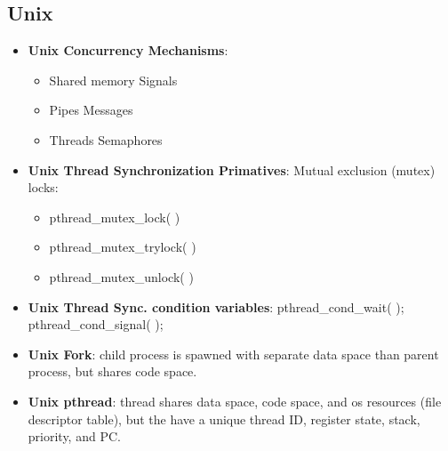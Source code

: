\documentclass[fontsize=5pt]{scrartcl}
\begin{document}
\begin{multicols}{3}
      \subsection{Unix}
      \begin{itemize}
        \item \textbf{Unix Concurrency Mechanisms}:
        \begin{itemize}
          \item Shared memory   Signals
          \item Pipes           Messages
          \item Threads         Semaphores
        \end{itemize}
        \item \textbf{Unix Thread Synchronization Primatives}: Mutual exclusion (mutex) locks:
        \begin{itemize}
          \item pthread\_mutex\_lock( )
          \item pthread\_mutex\_trylock( )
          \item pthread\_mutex\_unlock( )
        \end{itemize}
        \item \textbf{Unix Thread Sync. condition variables}: pthread\_cond\_wait( ); pthread\_cond\_signal( );
        \item \textbf{Unix Fork}: child process is spawned with separate data space than parent process, but shares code space.
        \item \textbf{Unix pthread}: thread shares data space, code space, and os resources (file descriptor table), but the have a unique thread ID, 
                                      register state, stack, priority, and PC.
     \end{itemize}    


\end{multicols}
\end{document}
